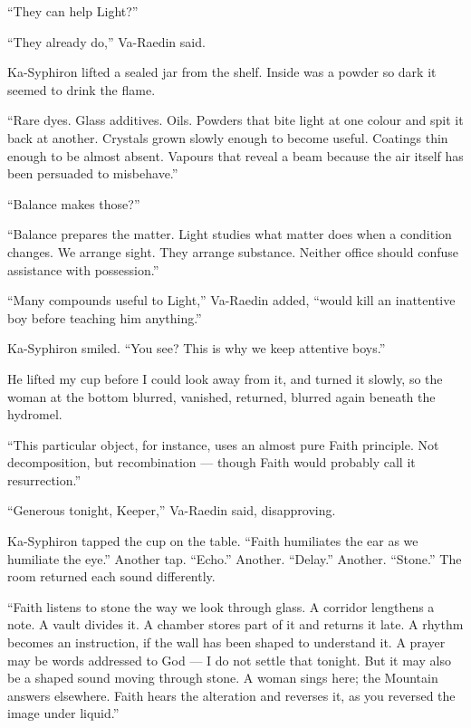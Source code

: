 ``They can help Light?''\par

``They already do,'' Va-Raedin said.\par

Ka-Syphiron lifted a sealed jar from the shelf. Inside was a powder so dark it seemed to drink the flame.\par

``Rare dyes. Glass additives. Oils. Powders that bite light at one colour and spit it back at another. Crystals grown slowly enough to become useful. Coatings thin enough to be almost absent. Vapours that reveal a beam because the air itself has been persuaded to misbehave.''\par

``Balance makes those?''\par

``Balance prepares the matter. Light studies what matter does when a condition changes. We arrange sight. They arrange substance. Neither office should confuse assistance with possession.''\par

``Many compounds useful to Light,'' Va-Raedin added, ``would kill an inattentive boy before teaching him anything.''\par

Ka-Syphiron smiled. ``You see? This is why we keep attentive boys.''\par

He lifted my cup before I could look away from it, and turned it slowly, so the woman at the bottom blurred, vanished, returned, blurred again beneath the hydromel.\par

``This particular object, for instance, uses an almost pure Faith principle. Not decomposition, but recombination --- though Faith would probably call it resurrection.''\par

``Generous tonight, Keeper,'' Va-Raedin said, disapproving.\par

Ka-Syphiron tapped the cup on the table. ``Faith humiliates the ear as we humiliate the eye.''
Another tap. ``Echo.''
Another. ``Delay.''
Another. ``Stone.''
The room returned each sound differently.\par

``Faith listens to stone the way we look through glass. A corridor lengthens a note. A vault divides it. A chamber stores part of it and returns it late. A rhythm becomes an instruction, if the wall has been shaped to understand it.
A prayer may be words addressed to God --- I do not settle that tonight. But it may also be a shaped sound moving through stone. A woman sings here; the Mountain answers elsewhere. Faith hears the alteration and reverses it, as you reversed the image under liquid.''\par

